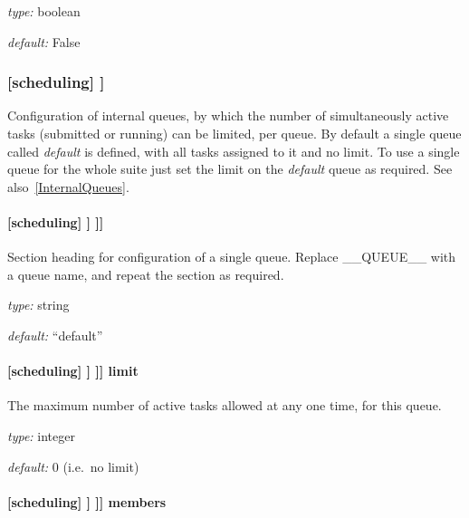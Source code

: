 \begin{myitemize}
    \item {\em type:} boolean
    \item {\em default:} False
\end{myitemize}

\subsubsection[{[[}queues{]]}]{[scheduling] \textrightarrow [[queues]]}

Configuration of internal queues, by which the number of simultaneously
active tasks (submitted or running) can be limited, per queue. By
default a single queue called {\em default} is defined, with all tasks
assigned to it and no limit. To use a single queue for the whole suite
just set the limit on the {\em default} queue as required.
See also~\ref{InternalQueues}.

\paragraph[{[[[}\_\_QUEUE\_\_{]]]}]{[scheduling] \textrightarrow [[queues]] \textrightarrow [[[\_\_QUEUE\_\_]]]}

Section heading for configuration of a single queue. Replace
\_\_QUEUE\_\_ with a queue name, and repeat the section as required.

\begin{myitemize}
\item {\em type:} string
\item {\em default:} ``default''
\end{myitemize}

\paragraph[limit]{[scheduling] \textrightarrow [[queues]] \textrightarrow [[[\_\_QUEUE\_\_]]] \textrightarrow limit}

The maximum number of active tasks allowed at any one time, for this queue.
\begin{myitemize}
\item {\em type:} integer
\item {\em default:} 0 (i.e.\ no limit)
\end{myitemize}

\paragraph[members]{[scheduling] \textrightarrow [[queues]] \textrightarrow [[[\_\_QUEUE\_\_]]] \textrightarrow members}

